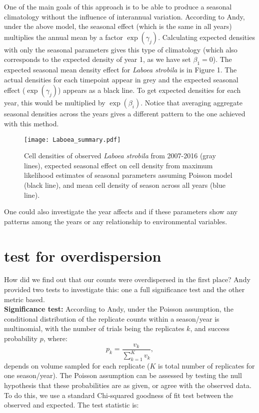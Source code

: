 \documentclass[11pt]{article}
\begin{document}
One of the main goals of this approach is to be able to produce a seasonal climatology without the influence of interannual variation. According to Andy, under the above model, the seasonal effect (which is the same in all years) multiplies the annual mean by a factor $\exp(\gamma_j)$. Calculating expected densities with only the seasonal parameters gives this type of climatology (which also corresponds to the expected density of year 1, as we have set $\beta_1=0$). The expected seasonal mean density effect for \textit{Laboea strobila} is in Figure 1. The actual densities for each timepoint appear in grey and the expected seasonal effect ($\exp(\gamma_j)$) appears as a black line. To get expected densities for each year, this would be multiplied by $\exp(\beta_i)$. Notice that averaging aggregate seasonal densities across the years gives a different pattern to the one achieved with this method.

\begin{figure}[h]
\centering
\texttt{[image: Laboea\_summary.pdf]}
\caption{Cell densities of observed \textit{Laboea strobila} from 2007-2016 (gray lines), expected seasonal effect on cell density from maximum likelihood estimates of seasonal parameters assuming Poisson model (black line), and mean cell density of season across all years (blue line).}
\end{figure}

One could also investigate the year affects and if these parameters show any patterns among the years or any relationship to environmental variables. 
\clearpage

\section{test for overdispersion}        

How did we find out that our counts were overdispersed in the first place? Andy provided two tests to investigate this: one a full significance test and the other metric based.\\

\noindent \textbf{Significance test:} According to Andy, under the Poisson assumption, the conditional distribution of the replicate counts within a season/year is multinomial, with the number of trials being the replicates $k$, and success probability $p$, where:
\[
p_k = \frac{v_k}{\sum_{k=1}^K v_k},
\]
depends on volume sampled for each replicate ($K$ is total number of replicates for one season/year). The Poisson assumption can be assessed by testing the null hypothesis that these probabilities are as given, or agree with the observed data. To do this, we use a standard Chi-squared goodness of fit test between the observed and expected. The test statistic is:
\end{document}
